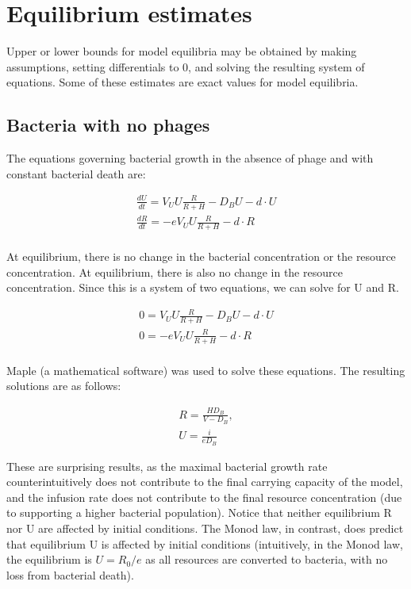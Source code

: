 \documentclass{article}
\begin{document}
\section {Equilibrium estimates}
 Upper or lower bounds for model equilibria may be obtained by making assumptions, setting differentials to 0, and solving the resulting system of equations. Some of these estimates are  exact values for model equilibria.

\subsection{Bacteria with no phages}
The equations governing bacterial growth in the absence of phage and with constant bacterial death are:

\begin{equation}
\begin{split}
\frac{dU}{dt} = V_UU\frac{R}{R+H} - D_BU - d \cdot U \\
\frac{dR}{dt} = -eV_UU\frac{R}{R+H}  - d \cdot R \\
\end{split}
\end{equation}

At equilibrium, there is no change in the bacterial concentration or the resource concentration. At equilibrium, there is also no change in the resource concentration. Since this is a system of two equations, we can solve for U and R. 

\begin{equation}
\begin{split}
0 = V_UU\frac{R}{R+H} - D_BU - d \cdot U \\
0 = -eV_UU\frac{R}{R+H}  - d \cdot R \\
\end{split}
\end{equation}

Maple (a mathematical software) was used to solve these equations. The resulting solutions are as follows:

\begin{equation}
\begin{split}
R = \frac{HD_B}{V - D_B}, \\ U = \frac{i}{eD_B}
\end{split}
\end{equation}

These are surprising results, as the maximal bacterial growth rate counterintuitively does not contribute to the final carrying capacity of the model, and the infusion rate does not contribute to the final resource concentration (due to supporting a higher bacterial population). Notice that neither equilibrium R nor U are affected by initial conditions. The Monod law, in contrast, does predict that equilibrium U is affected by initial conditions (intuitively, in the Monod law, the equilibrium is $U = R_0/e$ as all resources are converted to bacteria, with no loss from bacterial death). 
\end{document}
